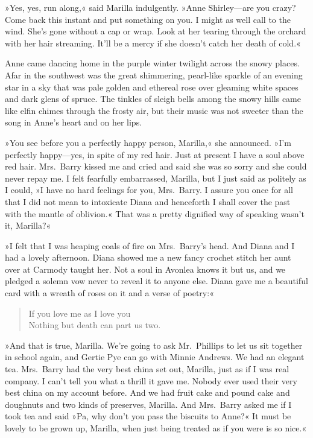 »Yes, yes, run along,« said Marilla indulgently. »Anne Shirley—are you crazy? Come back this instant and put something on you. I might as well call to the wind. She's gone without a cap or wrap. Look at her tearing through the orchard with her hair streaming. It'll be a mercy if she doesn't catch her death of cold.«

Anne came dancing home in the purple winter twilight across the snowy places. Afar in the southwest was the great shimmering, pearl-like sparkle of an evening star in a sky that was pale golden and ethereal rose over gleaming white spaces and dark glens of spruce. The tinkles of sleigh bells among the snowy hills came like elfin chimes through the frosty air, but their music was not sweeter than the song in Anne's heart and on her lips.

»You see before you a perfectly happy person, Marilla,« she announced. »I'm perfectly happy—yes, in spite of my red hair. Just at present I have a soul above red hair. Mrs.~Barry kissed me and cried and said she was so sorry and she could never repay me. I felt fearfully embarrassed, Marilla, but I just said as politely as I could, »I have no hard feelings for you, Mrs.~Barry. I assure you once for all that I did not mean to intoxicate Diana and henceforth I shall cover the past with the mantle of oblivion.« That was a pretty dignified way of speaking wasn't it, Marilla?«

»I felt that I was heaping coals of fire on Mrs.~Barry's head. And Diana and I had a lovely afternoon. Diana showed me a new fancy crochet stitch her aunt over at Carmody taught her. Not a soul in Avonlea knows it but us, and we pledged a solemn vow never to reveal it to anyone else. Diana gave me a beautiful card with a wreath of roses on it and a verse of poetry:«

\begin{verse}
If you love me as I love you\\
Nothing but death can part us two.
\end{verse}

»And that is true, Marilla. We're going to ask Mr.~Phillips to let us sit together in school again, and Gertie Pye can go with Minnie Andrews. We had an elegant tea. Mrs.~Barry had the very best china set out, Marilla, just as if I was real company. I can't tell you what a thrill it gave me. Nobody ever used their very best china on my account before. And we had fruit cake and pound cake and doughnuts and two kinds of preserves, Marilla. And Mrs.~Barry asked me if I took tea and said »Pa, why don't you pass the biscuits to Anne?« It must be lovely to be grown up, Marilla, when just being treated as if you were is so nice.«

